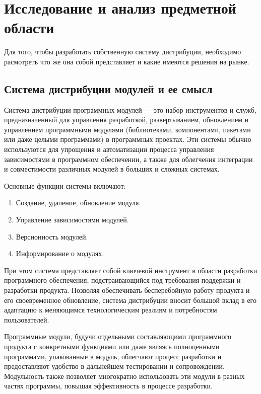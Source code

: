 \chapter{Исследование и анализ предметной области}
\label{cha:analysis}
%
%
Для того, чтобы разработать собственную систему дистрибуции, необходимо расмотреть что же она собой представляет и какие имеются решения на рынке.

\section{Система дистрибуции модулей и ее смысл}

Система дистрибуции программных модулей — это набор инструментов и служб, предназначенный для управления разработкой, развертыванием, обновлением и управлением программными модулями (библиотеками, компонентами, пакетами или даже целыми программами) в программных проектах. Эти системы обычно используются для упрощения и автоматизации процесса управления зависимостями в программном обеспечении, а также для облегчения интеграции и совместимости различных модулей в больших и сложных системах.

Основные функции системы включают:

\begin{enumerate}
\item Создание, удаление, обновление модуля.
\item Управление зависимостями модулей.
\item Версионность модулей.
\item Информирование о модулях.
\end{enumerate}

При этом система представляет собой ключевой инструмент в области разработки программного обеспечения, подстраивающийся под требования поддержки и разработки продукта. Позволяя обеспечивать бесперебойную работу продукта и его своевременное обновление, система дистрибуции вносит большой вклад в его адаптацию к меняющимся технологическим реалиям и потребностям пользователей.

Программные модули, будучи отдельными составляющими программного продукта с конкретными функциями или даже являясь полноценными программами, упакованные в модуль, облегчают процесс разработки и предоставляют удобство в дальнейшем тестировании и сопровождении. Модульность также позволяет многократно использовать эти модули в разных частях программы, повышая эффективность в процессе разработки.

